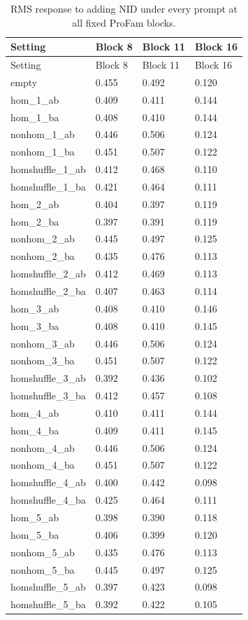 \documentclass[a4paper,11pt]{scrartcl}
\begin{document}
\begingroup\small
\begin{longtable}{@{}llll@{}}
\caption{RMS response to adding NID under every prompt at all fixed ProFam blocks.}\\
\toprule Setting & Block 8 & Block 11 & Block 16\\\midrule\endfirsthead
\toprule Setting & Block 8 & Block 11 & Block 16\\\midrule\endhead
empty & 0.455 & 0.492 & 0.120\\
hom\_1\_ab & 0.409 & 0.411 & 0.144\\
hom\_1\_ba & 0.408 & 0.410 & 0.144\\
nonhom\_1\_ab & 0.446 & 0.506 & 0.124\\
nonhom\_1\_ba & 0.451 & 0.507 & 0.122\\
homshuffle\_1\_ab & 0.412 & 0.468 & 0.110\\
homshuffle\_1\_ba & 0.421 & 0.464 & 0.111\\
hom\_2\_ab & 0.404 & 0.397 & 0.119\\
hom\_2\_ba & 0.397 & 0.391 & 0.119\\
nonhom\_2\_ab & 0.445 & 0.497 & 0.125\\
nonhom\_2\_ba & 0.435 & 0.476 & 0.113\\
homshuffle\_2\_ab & 0.412 & 0.469 & 0.113\\
homshuffle\_2\_ba & 0.407 & 0.463 & 0.114\\
hom\_3\_ab & 0.408 & 0.410 & 0.146\\
hom\_3\_ba & 0.408 & 0.410 & 0.145\\
nonhom\_3\_ab & 0.446 & 0.506 & 0.124\\
nonhom\_3\_ba & 0.451 & 0.507 & 0.122\\
homshuffle\_3\_ab & 0.392 & 0.436 & 0.102\\
homshuffle\_3\_ba & 0.412 & 0.457 & 0.108\\
hom\_4\_ab & 0.410 & 0.411 & 0.144\\
hom\_4\_ba & 0.409 & 0.411 & 0.145\\
nonhom\_4\_ab & 0.446 & 0.506 & 0.124\\
nonhom\_4\_ba & 0.451 & 0.507 & 0.122\\
homshuffle\_4\_ab & 0.400 & 0.442 & 0.098\\
homshuffle\_4\_ba & 0.425 & 0.464 & 0.111\\
hom\_5\_ab & 0.398 & 0.390 & 0.118\\
hom\_5\_ba & 0.406 & 0.399 & 0.120\\
nonhom\_5\_ab & 0.435 & 0.476 & 0.113\\
nonhom\_5\_ba & 0.445 & 0.497 & 0.125\\
homshuffle\_5\_ab & 0.397 & 0.423 & 0.098\\
homshuffle\_5\_ba & 0.392 & 0.422 & 0.105\\
\bottomrule\end{longtable}
\end{document}
